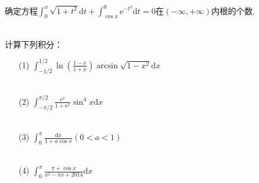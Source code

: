 \begin{xiti}
	
	\item 确定方程$\int _ { 0 } ^ { x } \sqrt { 1 + t ^ { 2 } } \mathrm { d } t + \int _ { \cos x } ^ { 0 } \mathrm { e } ^ { - t ^ { 2 } } \mathrm { d } t = 0$在$(-\infty,+\infty)$内根的个数.
	
		\begin{solution}
		\begin{align*}
		\end{align*}
	\end{solution}

	\item 计算下列积分：
	\begin{enumerate}
		\item [(1)]$\int _ { - 1 / 2 } ^ { 1 / 2 } \ln \left( \frac { 1 - x } { 1 + x } \right) \arcsin \sqrt { 1 - x ^ { 2 } } \mathrm { d } x$
		\begin{solution}
		\begin{align*}
		\end{align*}
	\end{solution}

		\item [(2)]$\int _ { - \pi / 2 } ^ { \pi / 2 } \frac { \mathrm { e } ^ { x } } { 1 + \mathrm { e } ^ { x } } \sin ^ { 4 } x \mathrm { d } x$
		
		\begin{solution}
		\begin{align*}
		\end{align*}
	\end{solution}

		\item [(3)]$\int _ { 0 } ^ { \pi } \frac { \mathrm { d } x } { 1 + a \cos x } ( 0 < a < 1 )$
		\begin{solution}
		\begin{align*}
		\end{align*}
	\end{solution}

		\item [(4)]$\int _ { 0 } ^ { \pi } \frac { \pi + \cos x } { x ^ { 2 } - \pi x + 2014 } \mathrm { d } x$
		\begin{solution}
		\begin{align*}
		\end{align*}
	\end{solution}


\end{enumerate}
\end{xiti}
